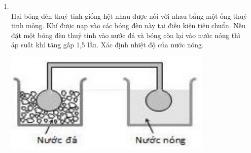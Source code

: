 \begin{enumerate}[label=\bfseries Câu \arabic*:, leftmargin=1.7cm]
\item {}\\
Hai bóng đèn thuỷ tinh giống hệt nhau được nối với nhau bằng một ống thuỷ tinh mỏng. Khí được nạp  vào các bóng đèn này tại điều kiện tiêu chuẩn. Nếu đặt một bóng đèn thuỷ tinh vào nước đá và bóng còn lại vào nước nóng thì áp suất khí tăng gấp 1,5 lần. Xác định nhiệt độ của nước nóng.
\begin{center}
	\includegraphics[width=0.35\linewidth]{../figs/VN12-Y24-PH-SYL-013P-4}
\end{center}
\end{enumerate}






